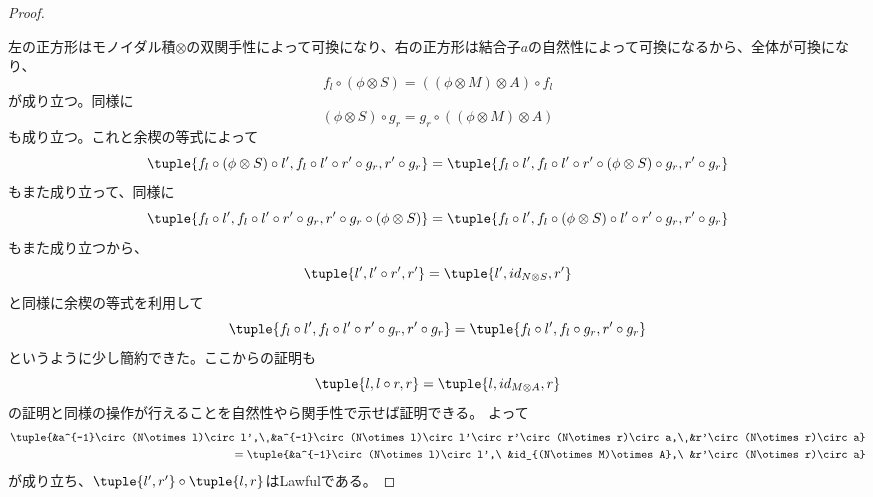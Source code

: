 \documentclass[uplatex,dvipdfmx]{jsarticle}
\begin{document}
\begin{proof}
\begin{center}
    \end{center}
    左の正方形はモノイダル積$\otimes$の双関手性によって可換になり、右の正方形は結合子$a$の自然性によって可換になるから、全体が可換になり、\[f_l\circ(\phi\otimes S) = ((\phi\otimes M)\otimes A)\circ f_l\]が成り立つ。同様に\[(\phi\otimes S)\circ g_r = g_r\circ((\phi\otimes M)\otimes A)\]も成り立つ。これと余楔の等式によって\[\tuple{f_l\circ(\phi\otimes S) \circ l',f_l\circ l'\circ r'\circ g_r, r'\circ g_r} = \tuple{f_l\circ l',f_l \circ l'\circ r'\circ(\phi\otimes S)\circ g_r, r'\circ g_r}\]もまた成り立って、同様に\[\tuple{f_l \circ l',f_l\circ l'\circ r'\circ g_r, r'\circ g_r\circ(\phi\otimes S)} = \tuple{f_l\circ l',f_l \circ(\phi\otimes S)\circ l'\circ r'\circ g_r, r'\circ g_r}\]もまた成り立つから、\[\tuple{l',l'\circ r', r'} = \tuple{l', id_{N\otimes S}, r'}\]と同様に余楔の等式を利用して\[\tuple{f_l\circ l',f_l\circ l'\circ r'\circ g_r, r'\circ g_r}=\tuple{f_l\circ l', f_l\circ g_r, r'\circ g_r}\]というように少し簡約できた。ここからの証明も\[\tuple{l,l\circ r, r} = \tuple{l, id_{M\otimes A}, r}\]の証明と同様の操作が行えることを自然性やら関手性で示せば証明できる。
    よって    \begin{alignat*}{2}
      \tuple{&a^{-1}\circ(N\otimes l)\circ l',\ &a^{-1}\circ(N\otimes l)\circ l'\circ r'\circ(N\otimes r)\circ a,\ &r'\circ(N\otimes r)\circ a}\\
      =\tuple{&a^{-1}\circ(N\otimes l)\circ l',\ &id_{(N\otimes M)\otimes A},\ &r'\circ(N\otimes r)\circ a}
    \end{alignat*}が成り立ち、$\tuple{l',r'}\circ\tuple{l,r}$はLawfulである。
    
  \end{proof}
\end{document}
